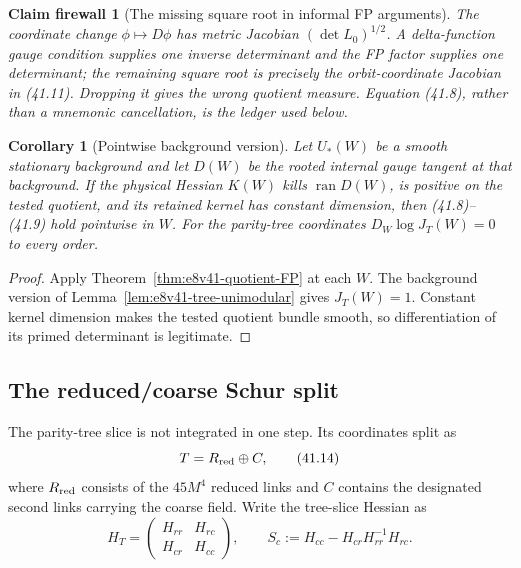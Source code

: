 \documentclass[11pt,oneside]{book}
\newtheorem{corollary}[theorem]{Corollary}
\newtheorem{firewall}[theorem]{Claim firewall}
\theoremstyle{definition}
\theoremstyle{remark}
\begin{document}
\begin{firewall}[The missing square root in informal FP arguments]
\label{fire:e8v41-orbit-root}
The coordinate change \(\phi\mapsto D\phi\) has metric Jacobian
\((\det L_0)^{1/2}\).  A delta-function gauge condition supplies
one inverse determinant and the FP factor supplies one determinant;
the remaining square root is precisely the orbit-coordinate
Jacobian in (41.11).  Dropping it gives the wrong quotient measure.
Equation (41.8), rather than a mnemonic cancellation, is the ledger
used below.
\end{firewall}

\begin{corollary}[Pointwise background version]
\label{cor:e8v41-background-bridge}
Let \(U_*(W)\) be a smooth stationary background and let \(D(W)\)
be the rooted internal gauge tangent at that background.  If the
physical Hessian \(K(W)\) kills \(\operatorname{ran}D(W)\), is
positive on the tested quotient, and its retained kernel has
constant dimension, then (41.8)--(41.9) hold pointwise in \(W\).
For the parity-tree coordinates \(D_W\log J_T(W)=0\) to every
order.
\end{corollary}

\begin{proof}
Apply Theorem~\ref{thm:e8v41-quotient-FP} at each \(W\).  The
background version of Lemma~\ref{lem:e8v41-tree-unimodular} gives
\(J_T(W)=1\).  Constant kernel dimension makes the tested quotient
bundle smooth, so differentiation of its primed determinant is
legitimate.
\end{proof}

\subsection{The reduced/coarse Schur split}

The parity-tree slice is not integrated in one step.  Its coordinates
split as
\[
 T=R_{\rm red}\oplus C,                                         \tag{41.14}
\]
where \(R_{\rm red}\) consists of the \(45M^4\) reduced links and
\(C\) contains the designated second links carrying the coarse
field.  Write the tree-slice Hessian as
\[
 H_T=
 \begin{pmatrix}
 H_{rr}&H_{rc}\\ H_{cr}&H_{cc}
 \end{pmatrix},
 \qquad
 S_c:=H_{cc}-H_{cr}H_{rr}^{-1}H_{rc}.                           \tag{41.15}
\]
\end{document}
